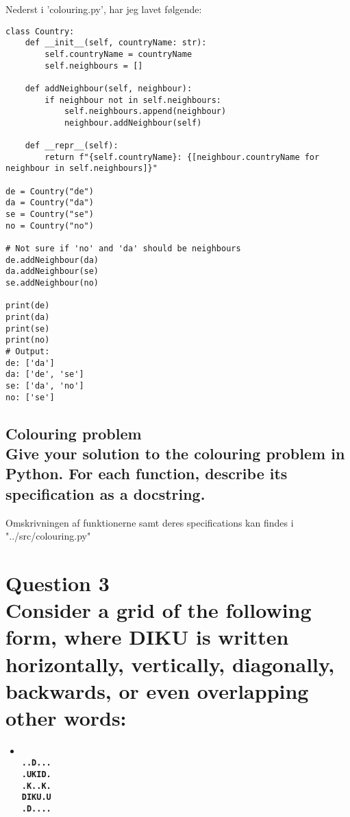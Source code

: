 \documentclass[a4paper,12pt]{article}
\begin{document}
Nederst i 'colouring.py', har jeg lavet følgende:

\begin{lstlisting}
class Country:
    def __init__(self, countryName: str):
        self.countryName = countryName
        self.neighbours = []
    
    def addNeighbour(self, neighbour):
        if neighbour not in self.neighbours:
            self.neighbours.append(neighbour)
            neighbour.addNeighbour(self)
    
    def __repr__(self):
        return f"{self.countryName}: {[neighbour.countryName for neighbour in self.neighbours]}"
    
de = Country("de")
da = Country("da")
se = Country("se")
no = Country("no")
    
# Not sure if 'no' and 'da' should be neighbours
de.addNeighbour(da)
da.addNeighbour(se)
se.addNeighbour(no)
    
print(de)
print(da)
print(se)
print(no)
# Output:
de: ['da']
da: ['de', 'se']
se: ['da', 'no']
no: ['se']
\end{lstlisting}


\subsection[Colouring problem]{Colouring problem\\
Give your solution to the colouring problem in Python. For each function, describe its specification as a docstring.}

Omskrivningen af funktionerne samt deres specifications kan findes i "../src/colouring.py"

\section[Question 3 - DIKU]{Question 3\\
Consider a grid of the following form, where DIKU is written horizontally, vertically, diagonally, backwards, or even overlapping other words:}
\begin{itemize}
    \item[] \textbf{\\
    \lstinline{..D...}\\
    \lstinline{.UKID.}\\
    \lstinline{.K..K.}\\
    \lstinline{DIKU.U}\\
    \lstinline{.D....}}
\end{itemize}
\end{document}
